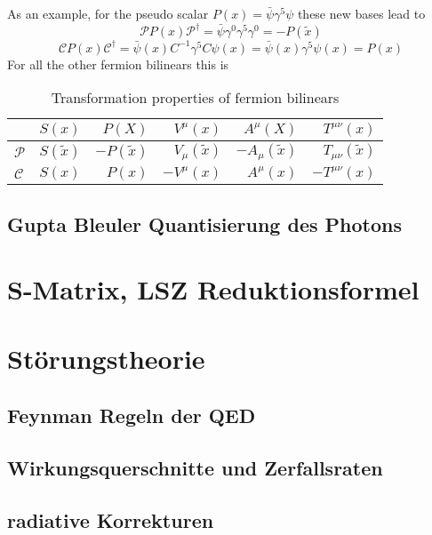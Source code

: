 \documentclass{include/thesisclass}
\begin{document}
As an example, for the pseudo scalar $P(x) = \bar \psi \gamma^5 \psi$ these new bases lead to
\[\mathcal P P(x) \mathcal P^\dagger = \bar \psi \gamma^0 \gamma^5 \gamma^0 = - P(\tilde x)\]
\[\mathcal C P(x) \mathcal C^\dagger = \bar \psi(x) C^{-1} \gamma^5 C \psi(x) = \bar \psi(x) \gamma^5 \psi(x) = P(x)\]
For all the other fermion bilinears this is
\begin{table}[H]
\centering
\begin{tabular}{l|rrrrr}
&$S(x)$&$P(X)$&$V^\mu(x)$&$A^\mu(X)$&$T^{\mu\nu}(x)$\\
\midrule
$\mathcal P$ & $S(\tilde x)$ & $-P(\tilde x)$ & $V_\mu(\tilde x)$&$-A_\mu(\tilde x)$&$ T_{\mu\nu}(\tilde x)$\\
$\mathcal C$&$ S(x) $&$ P(x) $&$ - V^\mu(x) $&$ A^\mu(x) $&$ - T^{\mu\nu}(x) $\\
\end{tabular}
\caption{Transformation properties of fermion bilinears}
\end{table}



\section{Gupta Bleuler Quantisierung des Photons}

\chapter{S-Matrix, LSZ Reduktionsformel}

\chapter{Störungstheorie}	
\section{Feynman Regeln der QED}
\section{Wirkungsquerschnitte und Zerfallsraten}
\section{radiative Korrekturen}
\end{document}
